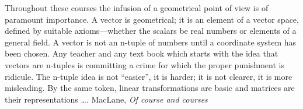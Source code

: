 \documentclass[11pt,openany]{book}
\begin{document}
\begin{boxquote}
Throughout these courses the infusion of a geometrical
point of view is of paramount importance. A vector
is geometrical; it is an element of a vector space, defined
by suitable axioms—whether the scalars be real numbers or
elements of a general field. A vector is not an n-tuple of
numbers until a coordinate system has been chosen. Any
teacher and any text book which starts with the idea that vectors
are n-tuples is committing a crime for which the proper
punishment is ridicule. The n-tuple idea is not ``easier'', it is
harder; it is not clearer, it is more misleading. By the same
token, linear transformations are basic and matrices are their
representations {\ldots}.
\tcblower
{MacLane, \emph{Of course and courses}~\cite{Maclane:1954:Courses}}
\end{boxquote}
\end{document}
